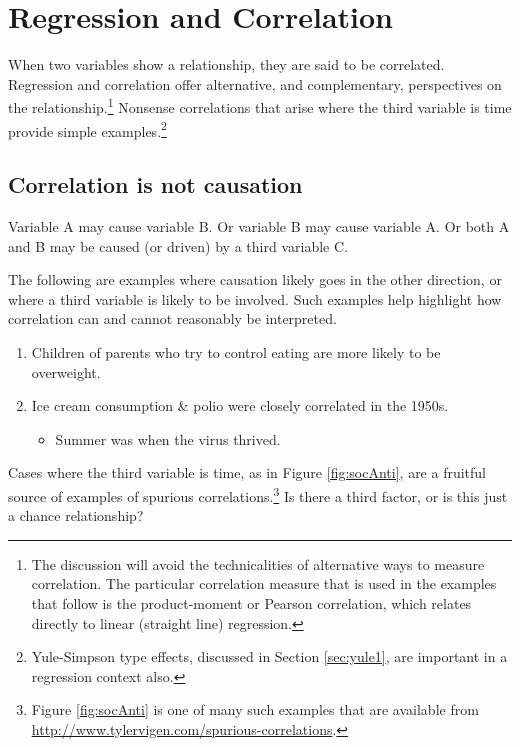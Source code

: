 \documentclass[
  10pt,
  b5paper]{book}
\providecommand{\tightlist}{%
  \setlength{\itemsep}{0pt}\setlength{\parskip}{0pt}}
\begin{document}
\hypertarget{sec:reg}{%
\chapter{Regression and Correlation}\label{sec:reg}}

When two variables show a relationship, they are said to be correlated. Regression and correlation offer alternative, and complementary, perspectives on the relationship.\footnote{The discussion will avoid the technicalities of alternative ways to measure correlation. The particular correlation measure that is used in the examples that follow is the product-moment or Pearson correlation, which relates directly to linear (straight line) regression.} Nonsense correlations that arise where the third variable is time provide simple examples.\footnote{Yule-Simpson type effects, discussed in Section \ref{sec:yule1}, are important in a regression context also.}

\hypertarget{correlation-is-not-causation}{%
\section{Correlation is not causation}\label{correlation-is-not-causation}}

Variable A may cause variable B. Or variable B may cause variable A. Or both A and B may be caused (or driven) by a third variable C.

The following are examples where causation likely goes in the other direction, or where a third variable is likely to be involved. Such examples help highlight how correlation can and cannot reasonably be interpreted.

\begin{enumerate}
\def\labelenumi{\arabic{enumi}.}
\tightlist
\item
  Children of parents who try to control eating are more likely to be overweight.
\item
  Ice cream consumption \& polio were closely correlated in the 1950s.

  \begin{itemize}
  \tightlist
  \item
    Summer was when the virus thrived.
  \end{itemize}
\end{enumerate}

Cases where the third variable is time, as in Figure \ref{fig:socAnti}, are a fruitful source of examples of spurious correlations.\footnote{Figure \ref{fig:socAnti} is one of many such examples that are available from\\
  \url{http://www.tylervigen.com/spurious-correlations}.} Is there a third factor, or is this just a chance relationship?
\end{document}
